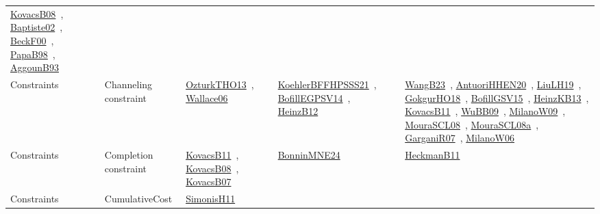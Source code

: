 {\begin{longtable}{lp{3cm}>{\raggedright\arraybackslash}p{6cm}>{\raggedright\arraybackslash}p{6cm}>{\raggedright\arraybackslash}p{8cm}}
\href{../works/KovacsB08.pdf}{KovacsB08}~\cite{KovacsB08}, \href{../works/Baptiste02.pdf}{Baptiste02}~\cite{Baptiste02}, \href{../works/BeckF00.pdf}{BeckF00}~\cite{BeckF00}, \href{../works/PapaB98.pdf}{PapaB98}~\cite{PapaB98}, \href{../works/AggounB93.pdf}{AggounB93}~\cite{AggounB93}\\
Constraints & Channeling constraint & \href{../works/OzturkTHO13.pdf}{OzturkTHO13}~\cite{OzturkTHO13}, \href{../works/Wallace06.pdf}{Wallace06}~\cite{Wallace06} & \href{../works/KoehlerBFFHPSSS21.pdf}{KoehlerBFFHPSSS21}~\cite{KoehlerBFFHPSSS21}, \href{../works/BofillEGPSV14.pdf}{BofillEGPSV14}~\cite{BofillEGPSV14}, \href{../works/HeinzB12.pdf}{HeinzB12}~\cite{HeinzB12} & \href{../works/WangB23.pdf}{WangB23}~\cite{WangB23}, \href{../works/AntuoriHHEN20.pdf}{AntuoriHHEN20}~\cite{AntuoriHHEN20}, \href{../works/LiuLH19.pdf}{LiuLH19}~\cite{LiuLH19}, \href{../works/GokgurHO18.pdf}{GokgurHO18}~\cite{GokgurHO18}, \href{../works/BofillGSV15.pdf}{BofillGSV15}~\cite{BofillGSV15}, \href{../works/HeinzKB13.pdf}{HeinzKB13}~\cite{HeinzKB13}, \href{../works/KovacsB11.pdf}{KovacsB11}~\cite{KovacsB11}, \href{../works/WuBB09.pdf}{WuBB09}~\cite{WuBB09}, \href{../works/MilanoW09.pdf}{MilanoW09}~\cite{MilanoW09}, \href{../works/MouraSCL08.pdf}{MouraSCL08}~\cite{MouraSCL08}, \href{../works/MouraSCL08a.pdf}{MouraSCL08a}~\cite{MouraSCL08a}, \href{../works/GarganiR07.pdf}{GarganiR07}~\cite{GarganiR07}, \href{../works/MilanoW06.pdf}{MilanoW06}~\cite{MilanoW06}\\
Constraints & Completion constraint & \href{../works/KovacsB11.pdf}{KovacsB11}~\cite{KovacsB11}, \href{../works/KovacsB08.pdf}{KovacsB08}~\cite{KovacsB08}, \href{../works/KovacsB07.pdf}{KovacsB07}~\cite{KovacsB07} & \href{../works/BonninMNE24.pdf}{BonninMNE24}~\cite{BonninMNE24} & \href{../works/HeckmanB11.pdf}{HeckmanB11}~\cite{HeckmanB11}\\
Constraints & CumulativeCost & \href{../works/SimonisH11.pdf}{SimonisH11}~\cite{SimonisH11} &  & \\

\end{longtable}}
